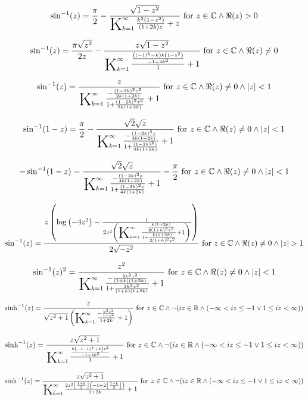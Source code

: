 \documentclass{article}
\newcommand{\bigK}{\mathop{\raisebox{-5pt}{\huge K}}}
\begin{document}
\[\sin ^{-1}(z)=\frac{\pi }{2}-\frac{\sqrt{1-z^2}}{\bigK_{k=1}^{\infty}\frac{k^2 \left(1-z^2\right)}{(1+2 k) z}+z}\text{ for }z\in \mathbb{C}\land \Re(z)>0\] 

\[\sin ^{-1}(z)=\frac{\pi  \sqrt{z^2}}{2 z}-\frac{z \sqrt{1-z^2}}{\bigK_{k=1}^{\infty}\frac{\frac{\left((-1)^k-k\right) k \left(1-z^2\right)}{-1+4 k^2}}{1}+1}\text{ for }z\in \mathbb{C}\land \Re(z)\neq 0\] 

\[\sin ^{-1}(z)=\frac{z}{\bigK_{k=1}^{\infty}\frac{-\frac{(1-2 k)^2 z^2}{2 k (1+2 k)}}{1+\frac{(1-2 k)^2 z^2}{2 k (1+2 k)}}+1}\text{ for }z\in \mathbb{C}\land \Re(z)\neq 0\land \left| z\right| <1\] 

\[\sin ^{-1}(1-z)=\frac{\pi }{2}-\frac{\sqrt{2} \sqrt{z}}{\bigK_{k=1}^{\infty}\frac{-\frac{(1-2 k)^2 z}{4 k (1+2 k)}}{1+\frac{(1-2 k)^2 z}{4 k (1+2 k)}}+1}\text{ for }z\in \mathbb{C}\land \Re(z)\neq 0\land \left| z\right| <1\] 

\[-\sin ^{-1}(1-z)=\frac{\sqrt{2} \sqrt{z}}{\bigK_{k=1}^{\infty}\frac{-\frac{(1-2 k)^2 z}{4 k (1+2 k)}}{1+\frac{(1-2 k)^2 z}{4 k (1+2 k)}}+1}-\frac{\pi }{2}\text{ for }z\in \mathbb{C}\land \Re(z)\neq 0\land \left| z\right| <1\] 

\[\sin ^{-1}(z)=\frac{z \left(\log \left(-4 z^2\right)-\frac{1}{2 z^2 \left(\bigK_{k=1}^{\infty}\frac{-\frac{k (1+2 k)}{2 (1+k)^2 z^2}}{1+\frac{k (1+2 k)}{2 (1+k)^2 z^2}}+1\right)}\right)}{2 \sqrt{-z^2}}\text{ for }z\in \mathbb{C}\land \Re(z)\neq 0\land \left| z\right| >1\] 

\[\sin ^{-1}(z)^2=\frac{z^2}{\bigK_{k=1}^{\infty}\frac{-\frac{2 k^2 z^2}{(1+k) (1+2 k)}}{1+\frac{2 k^2 z^2}{(1+k) (1+2 k)}}+1}\text{ for }z\in \mathbb{C}\land \Re(z)\neq 0\land \left| z\right| <1\] 

\[\sinh ^{-1}(z)=\frac{z}{\sqrt{z^2+1} \left(\bigK_{k=1}^{\infty}\frac{-\frac{k^2 z^2}{1+z^2}}{1+2 k}+1\right)}\text{ for }z\in \mathbb{C}\land \neg (i z\in \mathbb{R}\land (-\infty <i z\leq -1\lor 1\leq i z<\infty ))\] 

\[\sinh ^{-1}(z)=\frac{z \sqrt{z^2+1}}{\bigK_{k=1}^{\infty}\frac{\frac{k \left(-(-1)^k+k\right) z^2}{-1+4 k^2}}{1}+1}\text{ for }z\in \mathbb{C}\land \neg (i z\in \mathbb{R}\land (-\infty <i z\leq -1\lor 1\leq i z<\infty ))\] 

\[\sinh ^{-1}(z)=\frac{z \sqrt{z^2+1}}{\bigK_{k=1}^{\infty}\frac{2 z^2 \left\lfloor \frac{1+k}{2}\right\rfloor  \left(-1+2 \left\lfloor \frac{1+k}{2}\right\rfloor \right)}{1+2 k}+1}\text{ for }z\in \mathbb{C}\land \neg (i z\in \mathbb{R}\land (-\infty <i z\leq -1\lor 1\leq i z<\infty ))\] 
\end{document}
